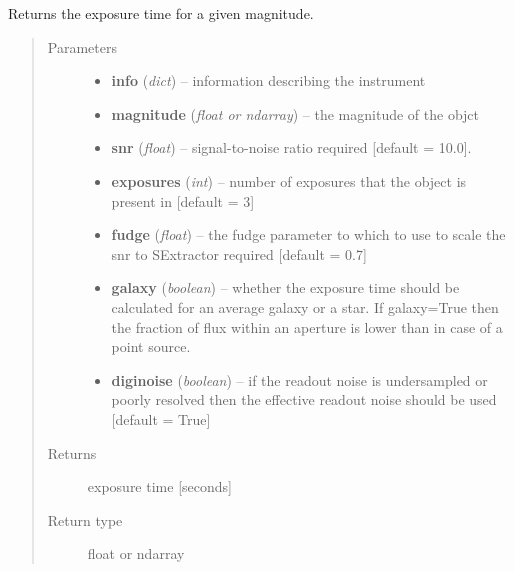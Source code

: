 \documentclass[a4paper,12pt,english]{sphinxmanual}
\begin{document}
\begin{fulllineitems}
\label{ETC:analysis.ETC.exposureTime}
Returns the exposure time for a given magnitude.
\begin{quote}\begin{description}
\item[{Parameters}] \leavevmode\begin{itemize}
\item {} 
\textbf{info} (\emph{dict}) -- information describing the instrument

\item {} 
\textbf{magnitude} (\emph{float or ndarray}) -- the magnitude of the objct

\item {} 
\textbf{snr} (\emph{float}) -- signal-to-noise ratio required {[}default = 10.0{]}.

\item {} 
\textbf{exposures} (\emph{int}) -- number of exposures that the object is present in {[}default = 3{]}

\item {} 
\textbf{fudge} (\emph{float}) -- the fudge parameter to which to use to scale the snr to SExtractor required {[}default = 0.7{]}

\item {} 
\textbf{galaxy} (\emph{boolean}) -- whether the exposure time should be calculated for an average galaxy or a star.
If galaxy=True then the fraction of flux within an aperture is lower than in case of a point source.

\item {} 
\textbf{diginoise} (\emph{boolean}) -- if the readout noise is undersampled or poorly resolved then the effective readout noise
should be used {[}default = True{]}

\end{itemize}

\item[{Returns}] \leavevmode
exposure time {[}seconds{]}

\item[{Return type}] \leavevmode
float or ndarray

\end{description}\end{quote}

\end{fulllineitems}
\end{document}
